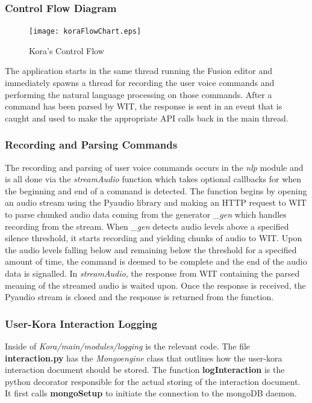 \documentclass[onecolumn, draftclsnofoot,10pt, compsoc]{IEEEtran}
\begin{document}
\subsubsection{Control Flow Diagram}
	\begin{figure}[H]
		\texttt{[image: koraFlowChart.eps]}
		\centering
		\caption{Kora's Control Flow}
	\end{figure}
The application starts in the same thread running the Fusion editor and immediately spawns a thread for recording the user voice commands and performing the natural language processing on those commands.
After a command has been parsed by WIT, the response is sent in an event that is caught and used to make the appropriate API calls back in the main thread.

\subsubsection{Recording and Parsing Commands}
The recording and parsing of user voice commands occurs in the \textit{nlp} module and is all done via the \textit{streamAudio} function which takes optional callbacks for when the beginning and end of a command is detected.
The function begins by opening an audio stream using the Pyaudio library and making an HTTP request to WIT to parse chunked audio data coming from the generator \textit{\_gen} which handles recording from the stream.
When \textit{\_gen} detects audio levels above a specified silence threshold, it starts recording and yielding chunks of audio to WIT.
Upon the audio levels falling below and remaining below the threshold for a specified amount of time, the command is deemed to be complete and the end of the audio data is signalled.
In \textit{streamAudio}, the response from WIT containing the parsed meaning of the streamed audio is waited upon.
Once the response is received, the Pyaudio stream is closed and the response is returned from the function.

\subsubsection{User-Kora Interaction Logging }
Inside of \textit{Kora/main/modules/logging} is the relevant code.
The file \textbf{interaction.py} has the \textit{Mongoengine} class that outlines how the user-kora interaction document should be stored. The function \textbf{logInteraction} is the python decorator responsible for the actual storing of the interaction document. It first calls \textbf{mongoSetup} to initiate the connection to the mongoDB daemon.
\end{document}
